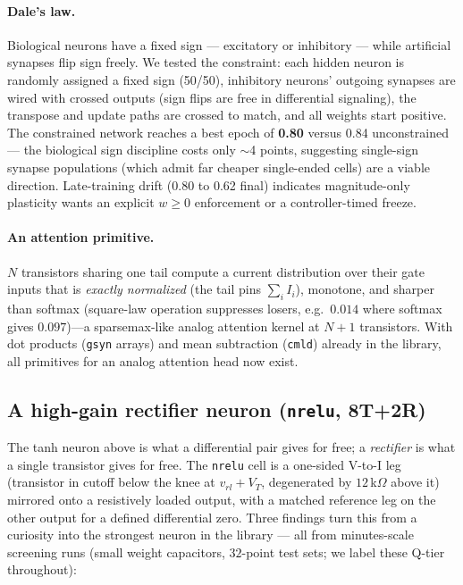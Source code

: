 \documentclass[11pt]{article}
\begin{document}
\paragraph{Dale's law.} Biological neurons have a fixed sign --- excitatory or inhibitory --- while artificial synapses flip sign freely. We tested the constraint: each hidden neuron is randomly assigned a fixed sign (50/50), inhibitory neurons' outgoing synapses are wired with crossed outputs (sign flips are free in differential signaling), the transpose and update paths are crossed to match, and all weights start positive. The constrained network reaches a best epoch of \textbf{0.80} versus 0.84 unconstrained --- the biological sign discipline costs only $\sim$4 points, suggesting single-sign synapse populations (which admit far cheaper single-ended cells) are a viable direction. Late-training drift (0.80 to 0.62 final) indicates magnitude-only plasticity wants an explicit $w \ge 0$ enforcement or a controller-timed freeze.

\paragraph{An attention primitive.} $N$ transistors sharing one tail compute a current distribution over their gate inputs that is \emph{exactly normalized} (the tail pins $\sum_i I_i$), monotone, and sharper than softmax (square-law operation suppresses losers, e.g.\ $0.014$ where softmax gives $0.097$)---a sparsemax-like analog attention kernel at $N{+}1$ transistors. With dot products (\texttt{gsyn} arrays) and mean subtraction (\texttt{cmld}) already in the library, all primitives for an analog attention head now exist.

\subsection{A high-gain rectifier neuron (\texttt{nrelu}, 8T+2R)}
\label{sec:nrelu}

The tanh neuron above is what a differential pair gives for free; a \emph{rectifier} is what a single transistor gives for free. The \texttt{nrelu} cell is a one-sided V-to-I leg (transistor in cutoff below the knee at $v_{rl}+V_T$, degenerated by $12$\,k$\Omega$ above it) mirrored onto a resistively loaded output, with a matched reference leg on the other output for a defined differential zero. Three findings turn this from a curiosity into the strongest neuron in the library --- all from minutes-scale screening runs (small weight capacitors, $32$-point test sets; we label these Q-tier throughout):
\end{document}
